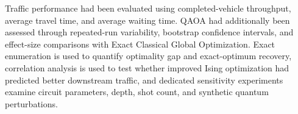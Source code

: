 \begin{itemize}
Traffic performance had been evaluated using completed-vehicle throughput, average
travel time, and average waiting time. QAOA had additionally been assessed through
repeated-run variability, bootstrap confidence intervals, and effect-size
comparisons with Exact Classical Global Optimization. Exact enumeration is used
to quantify optimality gap and exact-optimum recovery, correlation analysis is
used to test whether improved Ising optimization had predicted better downstream
traffic, and dedicated sensitivity experiments examine circuit parameters,
depth, shot count, and synthetic quantum perturbations.
\end{itemize}
